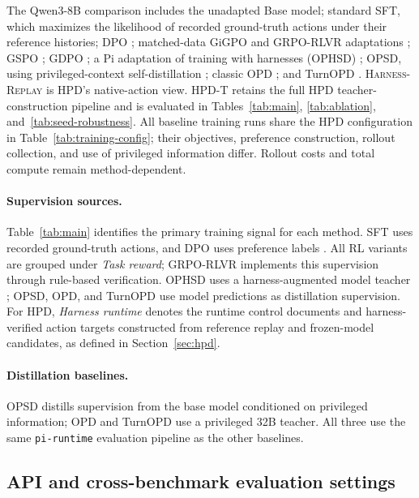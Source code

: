 \documentclass{article}
\newcommand{\replayaction}{\textsc{Harness-Replay}}
\begin{document}
The Qwen3-8B comparison includes the unadapted Base model; standard SFT,
which maximizes the likelihood of recorded ground-truth actions under their
reference histories; DPO
\citep{rafailov2023direct}; matched-data GiGPO and
GRPO-RLVR adaptations \citep{feng2025gigpo,shao2024deepseekmath}; GSPO
\citep{zheng2025gspo}; GDPO \citep{liu2026gdpo}; a Pi adaptation of training
with harnesses (OPHSD) \citep{zhao2026trainingharnesses}; OPSD,
using privileged-context self-distillation \citep{zhao2026selfdistilled};
classic OPD \citep{agarwal2024onpolicy}; and TurnOPD \citep{zhou2026turnopd}.
\replayaction{} is HPD's native-action view. HPD-T retains
the full HPD teacher-construction pipeline and is evaluated in
Tables~\ref{tab:main}, \ref{tab:ablation}, and~\ref{tab:seed-robustness}.
All baseline training
runs share the HPD configuration in Table~\ref{tab:training-config}; their
objectives, preference construction, rollout collection, and use of privileged
information differ. Rollout costs and total compute remain method-dependent.

\paragraph{Supervision sources.}
Table~\ref{tab:main} identifies the primary training signal for each method.
SFT uses recorded ground-truth actions, and DPO uses preference labels
\citep{rafailov2023direct}. All RL variants are grouped under \emph{Task reward}; GRPO-RLVR implements
this supervision through rule-based verification. OPHSD uses a harness-augmented model
teacher \citep{zhao2026trainingharnesses}; OPSD, OPD, and TurnOPD
use model predictions as distillation supervision. For HPD, \emph{Harness
runtime} denotes the runtime control documents and harness-verified action
targets constructed from reference replay and frozen-model candidates, as
defined in Section~\ref{sec:hpd}.

\paragraph{Distillation baselines.}
OPSD distills supervision from the base model conditioned on privileged
information; OPD and TurnOPD use a privileged 32B teacher. All three use
the same \texttt{pi-runtime} evaluation pipeline as the other baselines.

\subsection{API and cross-benchmark evaluation settings}
\end{document}
